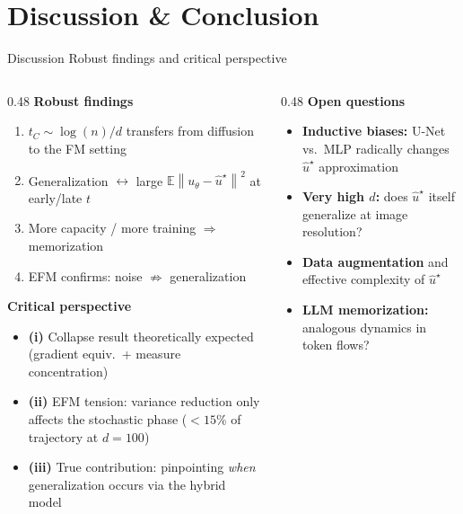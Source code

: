 \documentclass[10pt,aspectratio=169]{beamer}
\newcommand{\E}{\mathbb{E}}
\newcommand{\norm}[1]{\left\lVert #1 \right\rVert}
\begin{document}
\section{Discussion \& Conclusion}
\begin{frame}{Discussion}
  {Robust findings and critical perspective}

  \small
  \begin{columns}[t]
    \begin{column}{0.48\textwidth}
      \textcolor{TitleColor}{\bfseries Robust findings}
      \begin{enumerate}
        \item $t_C\sim\log(n)/d$ transfers from
          diffusion to the FM setting
        \item Generalization $\leftrightarrow$ large
          $\E\norm{u_\theta-\hat{u}^\star}^2$ at early/late $t$
        \item More capacity / more training
          $\Rightarrow$ memorization
        \item EFM confirms: noise $\not\Rightarrow$
          generalization
      \end{enumerate}

      \vspace{0.4em}
      \textcolor{TitleColor}{\bfseries Critical perspective}
      \begin{itemize}
        \item \textbf{(i)} Collapse result theoretically expected
          (gradient equiv.\ + measure concentration)
        \item \textbf{(ii)} EFM tension: variance reduction
          only affects the stochastic phase ($<15\%$
          of trajectory at $d=100$)
        \item \textbf{(iii)} True contribution: pinpointing
          \emph{when} generalization occurs via the hybrid model
      \end{itemize}
    \end{column}

    \begin{column}{0.48\textwidth}
      \textcolor{TitleColor}{\bfseries Open questions}
      \begin{itemize}
        \item \textbf{Inductive biases:} U-Net vs.\ MLP
          radically changes $\hat{u}^\star$ approximation
        \item \textbf{Very high $d$:} does $\hat{u}^\star$
          itself generalize at image resolution?
        \item \textbf{Data augmentation} and effective
          complexity of $\hat{u}^\star$
        \item \textbf{LLM memorization:}
          analogous dynamics in token flows?
      \end{itemize}


\end{column}
\end{columns}
\end{frame}
\end{document}
